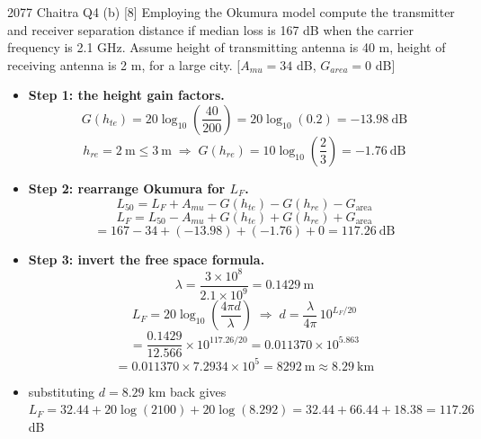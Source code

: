 \hr

{\color{sub}\footnotesize {} }

\begin{asked}{2077 Chaitra \textperiodcentered{} Q4 (b) \textperiodcentered{} [8]}
Employing the Okumura model compute the transmitter and receiver separation distance if median
loss is 167 dB when the carrier frequency is 2.1 GHz. Assume height of transmitting antenna is
40 m, height of receiving antenna is 2 m, for a large city.
[$A_{mu} = 34$ dB, $G_{area} = 0$ dB]
\end{asked}

\begin{itemize}
  \item \textbf{Step 1: the height gain factors.}
        \[ G(h_{te}) = 20\log_{10}\!\left(\frac{40}{200}\right) = 20\log_{10}(0.2)
                     = -13.98\ \text{dB} \]
        \[ h_{re} = 2\ \text{m} \le 3\ \text{m}
           \;\Rightarrow\; G(h_{re}) = 10\log_{10}\!\left(\frac{2}{3}\right) = -1.76\ \text{dB} \]
  \item \textbf{Step 2: rearrange Okumura for $L_F$.}
        \[ L_{50} = L_F + A_{mu} - G(h_{te}) - G(h_{re}) - G_{\text{area}} \]
        \[ L_F = L_{50} - A_{mu} + G(h_{te}) + G(h_{re}) + G_{\text{area}} \]
        \[ = 167 - 34 + (-13.98) + (-1.76) + 0 = \boxed{117.26\ \text{dB}} \]
  \item \textbf{Step 3: invert the free space formula.}
        \[ \lambda = \frac{3\times10^{8}}{2.1\times10^{9}} = 0.1429\ \text{m} \]
        \[ L_F = 20\log_{10}\!\left(\frac{4\pi d}{\lambda}\right)
           \;\Longrightarrow\;
           d = \frac{\lambda}{4\pi}\,10^{L_F/20} \]
        \[ = \frac{0.1429}{12.566} \times 10^{117.26/20}
          = 0.011370 \times 10^{5.863} \]
        \[ = 0.011370 \times 7.2934\times10^{5} = \boxed{8292\ \text{m} \approx 8.29\ \text{km}} \]
  \item {} substituting $d = 8.29$ km back gives
        $L_F = 32.44 + 20\log(2100) + 20\log(8.292) = 32.44 + 66.44 + 18.38 = 117.26$ dB
        \checkmark
\end{itemize}

\hr

{\color{sub}\footnotesize {} }

